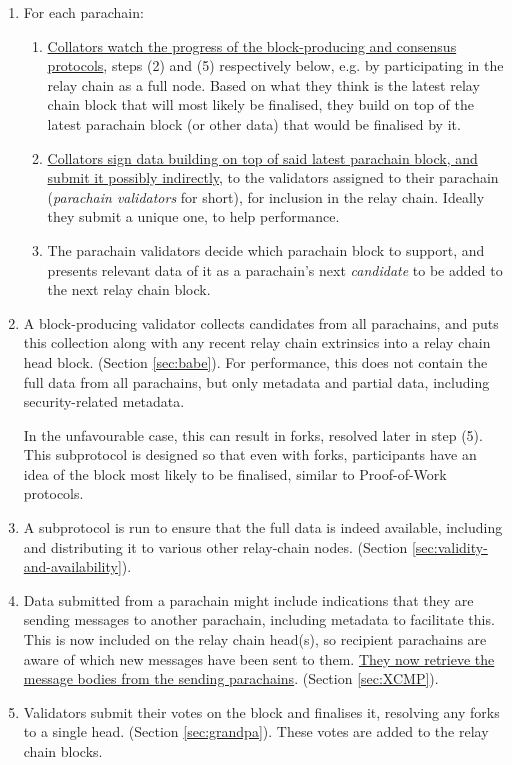 \begin{enumerate}
\item For each parachain:

  \begin{enumerate}
    \item \uline{Collators watch the progress of the block-producing and consensus protocols}, steps (2) and (5) respectively below, e.g. by participating in the relay chain as a full node. Based on what they think is the latest relay chain block that will most likely be finalised, they build on top of the latest parachain block (or other data) that would be finalised by it.
    \item \uline{Collators sign data building on top of said latest parachain block, and submit it possibly indirectly}, to the validators assigned to their parachain (\emph{parachain validators} for short), for inclusion in the relay chain. Ideally they submit a unique one, to help performance.
    \item The parachain validators decide which parachain block to support, and presents relevant data of it as a parachain's next \emph{candidate} to be added to the next relay chain block.
  \end{enumerate}

\item A block-producing validator collects candidates from all parachains, and puts this collection along with any recent relay chain extrinsics into a relay chain head block. (Section \ref{sec:babe}). For performance, this does not contain the full data from all parachains, but only metadata and partial data, including security-related metadata.

In the unfavourable case, this can result in forks, resolved later in step (5). This subprotocol is designed so that even with forks, participants have an idea of the block most likely to be finalised, similar to Proof-of-Work protocols.

\item A subprotocol is run to ensure that the full data is indeed available, including and distributing it to various other relay-chain nodes. (Section \ref{sec:validity-and-availability}).

\item Data submitted from a parachain might include indications that they are sending messages to another parachain, including metadata to facilitate this. This is now included on the relay chain head(s), so recipient parachains are aware of which new messages have been sent to them. \uline{They now retrieve the message bodies from the sending parachains}. (Section \ref{sec:XCMP}).

\item Validators submit their votes on the block and finalises it, resolving any forks to a single head. (Section \ref{sec:grandpa}). These votes are added to the relay chain blocks.

\end{enumerate}

